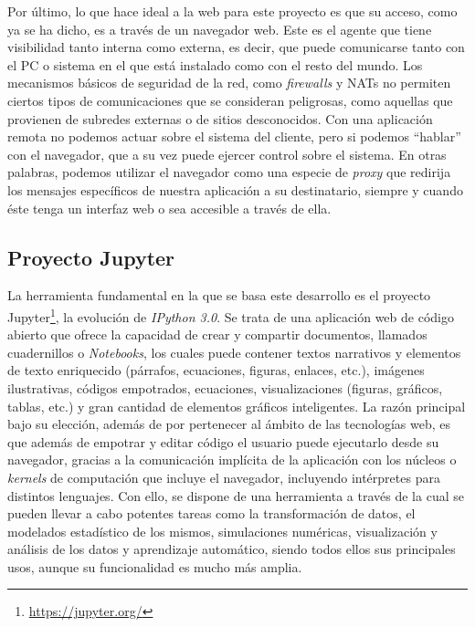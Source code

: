 Por último, lo que hace ideal a la web para este proyecto es que su acceso, como ya se ha dicho, es a través de un navegador web. Este es el agente que tiene visibilidad tanto interna como externa, es decir, que puede comunicarse tanto con el PC o sistema en el que está instalado como con el resto del mundo. Los mecanismos básicos de seguridad de la red, como \textit{firewalls} y NATs no permiten ciertos tipos de comunicaciones que se consideran peligrosas, como aquellas que provienen de subredes externas o de sitios desconocidos. Con una aplicación remota no podemos actuar sobre el sistema del cliente, pero si podemos ``hablar'' con el navegador, que a su vez puede ejercer control sobre el sistema. En otras palabras, podemos utilizar el navegador como una especie de \textit{proxy} que redirija los mensajes específicos de nuestra aplicación a su destinatario, siempre y cuando éste tenga un interfaz web o sea accesible a través de ella.

\subsection{Proyecto Jupyter}

La herramienta fundamental en la que se basa este desarrollo es el proyecto Jupyter\footnote{\url{https://jupyter.org/}}, la evolución de \textit{IPython 3.0}. Se trata de una aplicación web de código abierto que ofrece la capacidad de crear y compartir documentos, llamados cuadernillos o \textit{Notebooks}, los cuales puede contener textos narrativos y elementos de texto enriquecido (párrafos, ecuaciones, figuras, enlaces, etc.), imágenes ilustrativas, códigos empotrados, ecuaciones, visualizaciones (figuras, gráficos, tablas, etc.) y gran cantidad de elementos gráficos inteligentes. La razón principal bajo su elección, además de por pertenecer al ámbito de las tecnologías web, es que además de empotrar y editar código el usuario puede ejecutarlo desde su navegador, gracias a la comunicación implícita de la aplicación con los núcleos o \textit{kernels} de computación que incluye el navegador, incluyendo intérpretes para distintos lenguajes. Con ello, se dispone de una herramienta a través de la cual se pueden llevar a cabo potentes tareas como la transformación de datos, el modelados estadístico de los mismos, simulaciones numéricas, visualización y análisis de los datos y aprendizaje automático, siendo todos ellos sus principales usos, aunque su funcionalidad es mucho más amplia.

